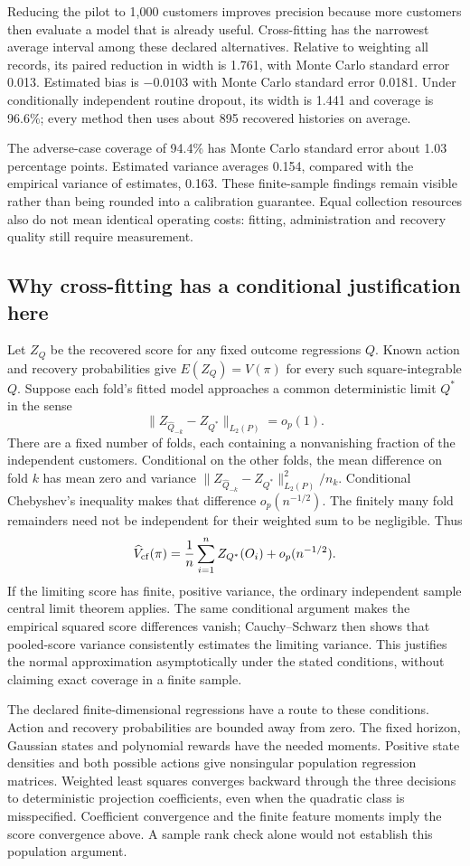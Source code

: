 Reducing the pilot to 1,000 customers improves precision because more
customers then evaluate a model that is already useful. Cross-fitting has
the narrowest average interval among these declared alternatives. Relative
to weighting all records, its paired reduction in width is 1.761, with
Monte Carlo standard error 0.013. Estimated bias is $-0.0103$ with Monte
Carlo standard error 0.0181. Under conditionally independent routine
dropout, its width is 1.441 and coverage is 96.6\%; every method then uses
about 895 recovered histories on average.

The adverse-case coverage of 94.4\% has Monte Carlo standard error about
1.03 percentage points. Estimated variance averages 0.154, compared with
the empirical variance of estimates, 0.163. These finite-sample findings
remain visible rather than being rounded into a calibration guarantee.
Equal collection resources also do not mean identical operating costs:
fitting, administration and recovery quality still require measurement.

\subsection{Why cross-fitting has a conditional justification here}
Let $Z_Q$ be the recovered score for any fixed outcome regressions $Q$.
Known action and recovery probabilities give $E(Z_Q)=V(\pi)$ for every
such square-integrable $Q$. Suppose each fold's fitted model approaches a
common deterministic limit $Q^*$ in the sense
\[
\|Z_{\widehat Q_{-k}}-Z_{Q^*}\|_{L_2(P)}=o_p(1).
\]
There are a fixed number of folds, each containing a nonvanishing fraction
of the independent customers. Conditional on the other folds, the mean
difference on fold $k$ has mean zero and variance
$\|Z_{\widehat Q_{-k}}-Z_{Q^*}\|_{L_2(P)}^2/n_k$.
Conditional Chebyshev's inequality makes that difference
$o_p(n^{-1/2})$. The finitely many fold remainders need not be independent
for their weighted sum to be negligible. Thus
\[
\widehat V_{\rm cf}(\pi)
=\frac{1}{n}\sum_{i=1}^{n} Z_{Q^*}(O_i)+o_p(n^{-1/2}).
\]
If the limiting score has finite, positive variance, the ordinary independent
sample central limit theorem applies. The same conditional argument makes
the empirical squared score differences vanish; Cauchy--Schwarz then shows
that pooled-score variance consistently estimates the limiting variance.
This justifies the normal approximation asymptotically under the stated
conditions, without claiming exact coverage in a finite sample.

The declared finite-dimensional regressions have a route to these conditions.
Action and recovery probabilities are bounded away from zero. The fixed
horizon, Gaussian states and polynomial rewards have the needed moments.
Positive state densities and both possible actions give nonsingular
population regression matrices. Weighted least squares converges backward
through the three decisions to deterministic projection coefficients, even
when the quadratic class is misspecified. Coefficient convergence and the
finite feature moments imply the score convergence above. A sample rank
check alone would not establish this population argument.

